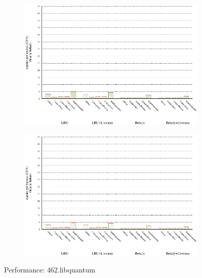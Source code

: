 \begin{figure}[!ht]
  \begin{subfigure}[b]{0.5\textwidth}%
    \includegraphics[width=\textwidth]{figs/plots/perf-misses-462-libquantum.eps}
  \end{subfigure}%
  \begin{subfigure}[b]{0.5\textwidth}%
    \includegraphics[width=\textwidth]{figs/plots/perf-462-libquantum.eps}
  \end{subfigure}%
  \caption{Performance: 462.libquantum}
  \label{fig:performance-462-libquantum}
\end{figure}

